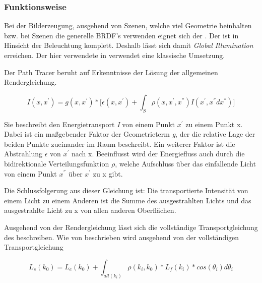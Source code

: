 \subsubsection{Funktionsweise}

Bei der Bilderzeugung, ausgehend von Szenen, welche viel Geometrie beinhalten bzw. bei Szenen 
die generelle BRDF's verwenden eignet sich der .
Der  ist in Hinsicht der Beleuchtung komplett. Deshalb lässt sich damit
\textit{Global Illumination} erreichen. Der hier verwendete  in 
\cite{Benty18} verwendet eine klassische Umsetzung.\par
Der Path Tracer beruht auf Erkenntnisse der Lösung der allgemeinen Rendergleichung.

\begin{equation}\label{eq:Allgemeine Rendergleichung}
    I(x,{x}^{'}) = g(x,{x}^{'}) * \biggl[\epsilon(x,{x}^{'}) + 
    \int_{S}^{} \rho(x,{x}^{'},{x}^{''})
    I({x}^{'},{x}^{''}d{x}^{''})\biggr] 
\end{equation}

Sie beschreibt den Energietransport \textit{I} von einem Punkt ${x}^{'}$
zu einem Punkt x. Dabei ist ein maßgebender Faktor der Geometrieterm \textit{g},
der die relative Lage der beiden Punkte zueinander im Raum beschreibt.
Ein weiterer Faktor ist die Abstrahlung \textit{$\epsilon$} von ${x}^{'}$ nach x. 
Beeinflusst wird der Energiefluss auch durch
die bidirektionale Verteilungsfunktion \textit{$\rho$}, welche Aufschluss über
das einfallende Licht von einem Punkt ${x}^{''}$ über ${x}^{'}$ zu x gibt.\par
Die Schlussfolgerung aus dieser Gleichung  ist: Die transportierte
Intensität von einem Licht zu einem Anderen ist die Summe des ausgestrahlten Lichts 
und das ausgestrahlte Licht zu x von allen anderen Oberflächen.

Ausgehend von der Rendergleichung  lässt sich
die vollständige Transportgleichung des 
beschreiben.
Wie von \cite{marschner2009fundamentals} beschrieben wird ausgehend von der vollständigen Transportgleichung

\begin{equation}\label{eq:vollständige Transportgleichung}
    L_s(k_0) = L_e(k_0) + \int_{all(k_i)}^{} \rho(k_i, k_0)*L_f(k_i)*cos(\theta_i)d\theta_i
\end{equation}

